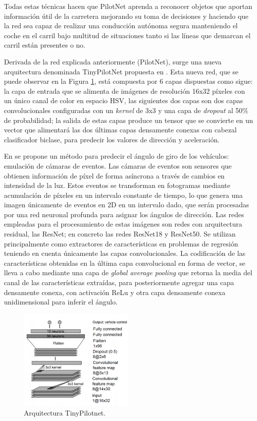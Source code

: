 Todas estas técnicas hacen que PilotNet aprenda a reconocer objetos que aportan información útil de la carretera mejorando su toma de decisiones y haciendo que la red sea capaz de realizar una conducción autónoma segura manteniendo el coche en el carril bajo multitud de situaciones tanto si las líneas que demarcan el carril están presentes o no.

Derivada de la red explicada anteriormente (PilotNet), surge una nueva arquitectura denominada TinyPilotNet propuesta en \cite{self-driving}. Esta nueva red, que se puede observar en la Figura \ref{fig.tinypilotnet}, está compuesta por 6 capas dispuestas como sigue: la capa de entrada que se alimenta de imágenes de resolución 16x32 píxeles con un único canal de color en espacio HSV, las siguientes dos capas son dos capas convolucionales configuradas con un \textit{kernel} de 3x3 y una capa de \textit{dropout} al 50\% de probabilidad; la salida de estas capas produce un tensor que se convierte en un vector que alimentará las dos últimas capas densamente conexas con cabezal clasificador biclase, para predecir los valores de dirección y aceleración.

En \cite{event} se propone un método para predecir el ángulo de giro de los vehículos: emulación de cámaras de eventos. Las cámaras de eventos son sensores que obtienen información de píxel de forma asíncrona a través de cambios en intensidad de la luz. Estos eventos se transforman en fotogramas mediante acumulación de píxeles en un intervalo constante de tiempo, lo que genera una imagen únicamente de eventos en 2D en un intervalo dado, que serán procesadas por una red neuronal profunda para asignar los ángulos de dirección. Las redes empleadas para el procesamiento de estas imágenes son redes con arquitectura residual, las ResNet; en concreto las redes ResNet18 y ResNet50. Se utilizan principalmente como extractores de características en problemas de regresión teniendo en cuenta únicamente las capas convolucionales. La codificación de las características obtenidas en la última capa convolucional en forma de vector, se lleva a cabo mediante una capa de \textit{global average pooling} que retorna la media del canal de las características extraídas, para posteriormente agregar una capa densamente conexa, con activación ReLu y otra capa densamente conexa unidimensional para inferir el ángulo.

\begin{figure}
\begin{center}
	\includegraphics[width=0.5\textwidth]{img/tinypilotnet.png}
   \caption{Arquitectura TinyPilotnet.}
	\label{fig.tinypilotnet}
\end{center}
\end{figure}

